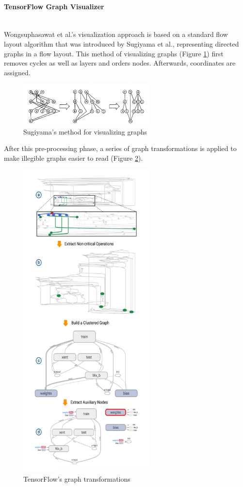 \documentclass{acmsiggraph}               %
\newcommand{\paragraphbr}[1]{\paragraph{#1}\mbox{}\\}
\begin{document}
\paragraphbr{TensorFlow Graph Visualizer}

Wongsuphasawat et al.'s visualization approach is based on a standard flow layout algorithm that was introduced by Sugiyama et al., representing directed graphs in a flow layout. \cite{Sugiyama1981} This method of visualizing graphs (Figure \ref{fig:sugiyama_method}) first removes cycles as well as layers and orders nodes. Afterwards, coordinates are assigned.

\begin{figure}[H]
\includegraphics[width=2.7in]{sugiyama_method_sugiyama_et_al}
\caption{Sugiyama's method for visualizing graphs \protect\cite{Sugiyama1981}}
\label{fig:sugiyama_method}
\centering
\end{figure}

After this pre-processing phase, a series of graph transformations is applied to make illegible graphs easier to read (Figure \ref{fig:transformations}). \\

\begin{figure}[!htb]
\includegraphics[width=2.7in]{transformations_Wongsuphasawat_et_al}
\caption{TensorFlow's graph transformations \protect\cite{Wongsuphasawat2018}}
\label{fig:transformations}
\end{figure}
\end{document}
